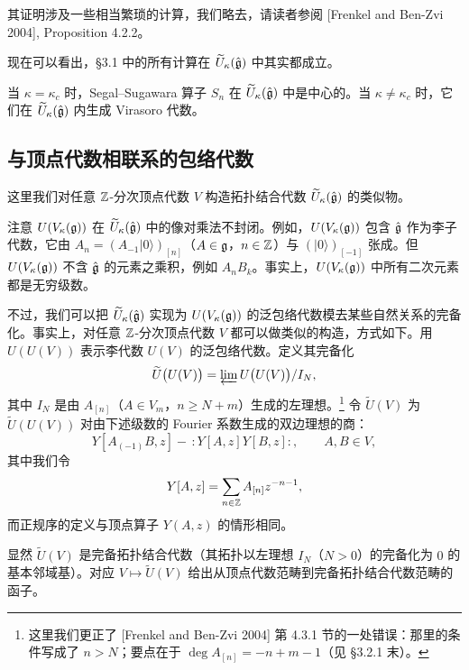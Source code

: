 
其证明涉及一些相当繁琐的计算，我们略去，请读者参阅 [Frenkel and Ben-Zvi 2004], Proposition 4.2.2。

现在可以看出，§3.1 中的所有计算在 $\widetilde U_\kappa(\hat{\mathfrak{g}})$ 中其实都成立。

\begin{corollary}
    当 $\kappa=\kappa_c$ 时，Segal--Sugawara 算子 $S_n$ 在 $\widetilde U_\kappa(\hat{\mathfrak{g}})$ 中是中心的。当 $\kappa\neq\kappa_c$ 时，它们在 $\widetilde U_\kappa(\hat{\mathfrak{g}})$ 内生成 Virasoro 代数。
\end{corollary}

\subsection{与顶点代数相联系的包络代数}

这里我们对任意 $\mathbb{Z}$-分次顶点代数 $V$ 构造拓扑结合代数 $\widetilde U_\kappa(\hat{\mathfrak{g}})$ 的类似物。

注意 $U(V_\kappa(\mathfrak{g}))$ 在 $\widetilde U_\kappa(\hat{\mathfrak{g}})$ 中的像对乘法不封闭。例如，$U(V_\kappa(\mathfrak{g}))$ 包含 $\hat{\mathfrak{g}}$ 作为李子代数，它由 $A_n=(A_{-1}|0\rangle)_{[n]}$（$A\in\mathfrak{g}$，$n\in\mathbb{Z}$）与 $(|0\rangle)_{[-1]}$ 张成。但 $U(V_\kappa(\mathfrak{g}))$ 不含 $\hat{\mathfrak{g}}$ 的元素之乘积，例如 $A_nB_k$。事实上，$U(V_\kappa(\mathfrak{g}))$ 中所有二次元素都是无穷级数。

不过，我们可以把 $\widetilde U_\kappa(\hat{\mathfrak{g}})$ 实现为 $U(V_\kappa(\mathfrak{g}))$ 的泛包络代数模去某些自然关系的完备化。事实上，对任意 $\mathbb{Z}$-分次顶点代数 $V$ 都可以做类似的构造，方式如下。用 $U(U(V))$ 表示李代数 $U(V)$ 的泛包络代数。定义其完备化
\[
    \widetilde U\bigl(U(V)\bigr) = \varprojlim U\bigl(U(V)\bigr)/I_N,
\]
其中 $I_N$ 是由 $A_{[n]}$（$A\in V_m$，$n\ge N+m$）生成的左理想。\footnote{这里我们更正了 [Frenkel and Ben-Zvi 2004] 第 4.3.1 节的一处错误：那里的条件写成了 $n>N$；要点在于 $\deg A_{[n]}=-n+m-1$（见 §3.2.1 末）。} 令 $\widetilde U(V)$ 为 $\widetilde U(U(V))$ 对由下述级数的 Fourier 系数生成的双边理想的商：
\[
    Y[A_{(-1)}B, z] - \,:Y[A,z]Y[B,z]:,
    \qquad A,B\in V,
\]
其中我们令
\[
    Y[A,z] = \sum_{n\in\mathbb{Z}} A_{[n]}z^{-n-1},
\]
而正规序的定义与顶点算子 $Y(A,z)$ 的情形相同。

显然 $\widetilde U(V)$ 是完备拓扑结合代数（其拓扑以左理想 $I_N$（$N>0$）的完备化为 $0$ 的基本邻域基）。对应 $V\mapsto\widetilde U(V)$ 给出从顶点代数范畴到完备拓扑结合代数范畴的函子。

